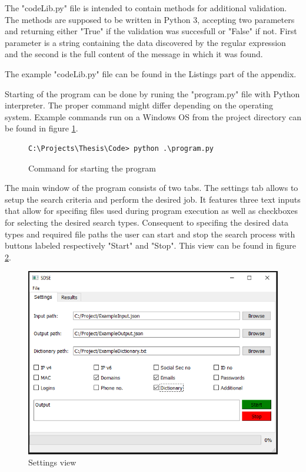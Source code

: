 \documentclass[a4paper,twoside,12pt]{book}
\begin{document}
The "codeLib.py" file is intended to contain methods for additional validation. The methods are supposed
to be written in Python 3, accepting two parameters and returning either "True" if the validation was succesfull
or "False" if not. First parameter is a string containing the data discovered by the regular expression and
the second is the full content of the message in which it was found.

The example "codeLib.py" file can be found in the Listings part of the appendix.

Starting of the program can be done by runing the "program.py" file with Python interpreter. The proper command
might differ depending on the operating system. Example commands run on a Windows OS from the project directory
can be found in figure \ref{fig:startCommand}.

\begin{figure}
\centering
\begin{lstlisting}
C:\Projects\Thesis\Code> python .\program.py
\end{lstlisting}
\caption{Command for starting the program}
\label{fig:startCommand}
\end{figure}

The main window of the program consists of two tabs. The settings tab allows to setup the search criteria and perform
the desired job. It features three text inputs that allow for specifing files used during program execution as well as 
checkboxes for selecting the desired search types. Consequent to specifing the desired data types and required file paths the user can start and stop the search process
with buttons labeled respectively "Start" and "Stop". This view can be found in figure \ref{fig:SettingsTab}.

\begin{figure}
\centering
\includegraphics{SettingsTab}
\caption{Settings view}
\label{fig:SettingsTab}
\end{figure}
\end{document}
